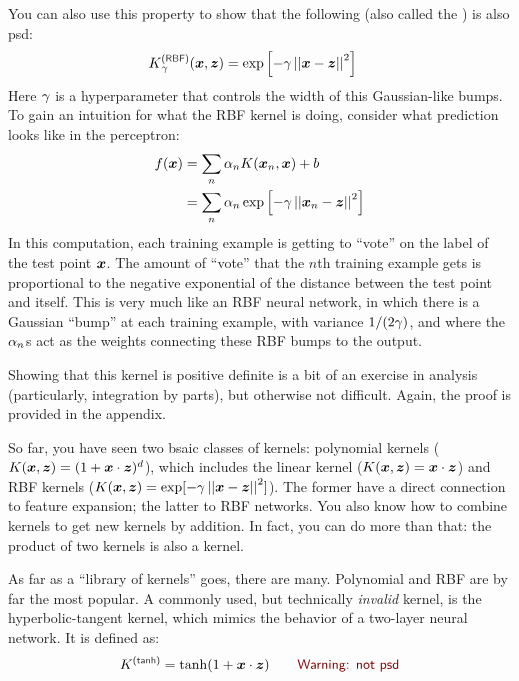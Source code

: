 You can also use this property to show that the following
 (also called the ) is
also psd:
%
\begin{align}
K\xth{RBF}_\ga(\vx,\vz) &= \exp\left[ - \ga \norm{\vx-\vz}^2 \right]
\end{align}
%
Here $\gamma$ is a hyperparameter that controls the width of this
Gaussian-like bumps.  To gain an intuition for what the RBF kernel is
doing, consider what prediction looks like in the perceptron:
%
\begin{align}
f({\boldsymbol{x}}) &= \sum_n \alpha_n K({\boldsymbol{x}}_n, {\boldsymbol{x}}) + b \\
&= \sum_n \alpha_n \exp\left[ - \gamma \left\vert\left\vert {\boldsymbol{x}}_n-{\boldsymbol{z}} \right\vert\right\vert^2 \right]
\end{align}
%
In this computation, each training example is getting to ``vote'' on
the label of the test point ${\boldsymbol{x}}$.  The amount of ``vote'' that the
$n$th training example gets is proportional to the negative
exponential of the distance between the test point and itself.  This
is very much like an RBF neural network, in which there is a Gaussian
``bump'' at each training example, with variance $1/(2\gamma)$, and where
the $\alpha_n$s act as the weights connecting these RBF bumps to the
output.

Showing that this kernel is positive definite is a bit of an exercise
in analysis (particularly, integration by parts), but otherwise not
difficult.  Again, the proof is provided in the appendix.

So far, you have seen two bsaic classes of kernels: polynomial kernels
($K({\boldsymbol{x}},{\boldsymbol{z}}) = (1 + {\boldsymbol{x}} \cdot {\boldsymbol{z}})^d$), which includes the linear
kernel ($K({\boldsymbol{x}},{\boldsymbol{z}}) = {\boldsymbol{x}} \cdot {\boldsymbol{z}}$) and RBF kernels ($K({\boldsymbol{x}},{\boldsymbol{z}}) =
\exp[-\gamma \left\vert\left\vert {\boldsymbol{x}}-{\boldsymbol{z}} \right\vert\right\vert^2]$).  The former have a direct connection to
feature expansion; the latter to RBF networks.  You also know how to
combine kernels to get new kernels by addition.  In fact, you can do
more than that: the product of two kernels is also a kernel.

As far as a ``library of kernels'' goes, there are many.  Polynomial
and RBF are by far the most popular.  A commonly used, but technically
\emph{invalid} kernel, is the hyperbolic-tangent kernel, which mimics
the behavior of a two-layer neural network.  It is defined as:
%
\begin{align}
K\xth{tanh} &= \tanh(1 + \dotp{\vx}{\vz})
\becauseof{Warning: not psd}
\end{align}

